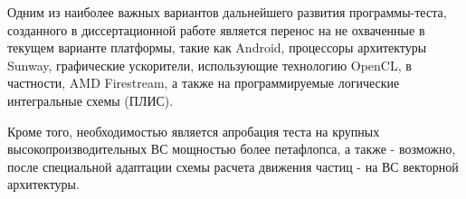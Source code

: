 Одним из наиболее важных вариантов дальнейшего развития программы-теста, созданного в диссертационной работе является перенос на не охваченные в текущем варианте платформы, такие как Android, процессоры архитектуры Sunway, графические ускорители, использующие технологию OpenCL, в частности, AMD Firestream, а также на программируемые логические интегральные схемы (ПЛИС).

Кроме того, необходимостью является апробация теста на крупных высокопроизводительных ВС мощностью более петафлопса, а также - возможно, после специальной адаптации схемы расчета движения частиц - на ВС векторной архитектуры.
